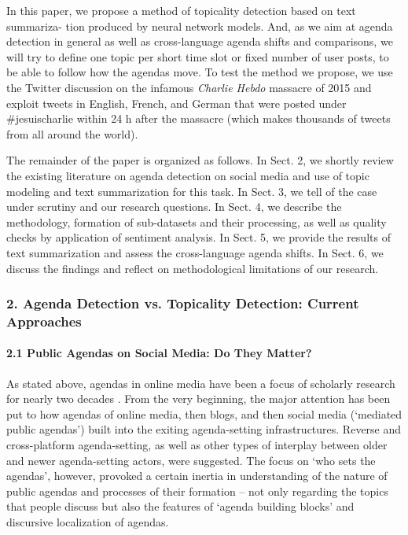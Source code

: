 In this paper, we propose a method of topicality detection based on text summariza- tion produced by neural network models. And, as we aim at agenda detection in general as well as cross-language agenda shifts and comparisons, we will try to define one topic per short time slot or fixed number of user posts, to be able to follow how the agendas move. To test the method we propose, we use the Twitter discussion on the infamous \textit{Charlie Hebdo} massacre of 2015 and exploit tweets in English, French, and German that were posted under \#jesuischarlie within 24 h after the massacre (which makes thousands of tweets from all around the world).

The remainder of the paper is organized as follows. In Sect. 2, we shortly review the existing literature on agenda detection on social media and use of topic modeling and text summarization for this task. In Sect. 3, we tell of the case under scrutiny and our research questions. In Sect. 4, we describe the methodology, formation of sub-datasets and their processing, as well as quality checks by application of sentiment analysis. In Sect. 5, we provide the results of text summarization and assess the cross-language agenda shifts. In Sect. 6, we discuss the findings and reflect on methodological limitations of our research.

\subsubsection{2. Agenda Detection vs. Topicality Detection: Current Approaches}

\paragraph{2.1 Public Agendas on Social Media: Do They Matter?}
As stated above, agendas in online media have been a focus of scholarly research for nearly two decades \cite{McCombs,KimLee}. From the very beginning, the major attention has been put to how agendas of online media, then blogs, and then social media (‘mediated public agendas’) built into the exiting agenda-setting infrastructures. Reverse and cross-platform agenda-setting, as well as other types of interplay between older and newer agenda-setting actors, were suggested. The focus on ‘who sets the agendas’, however, provoked a certain inertia in understanding of the nature of public agendas and processes of their formation – not only regarding the topics that people discuss but also the features of ‘agenda building blocks’ and discursive localization of agendas.

